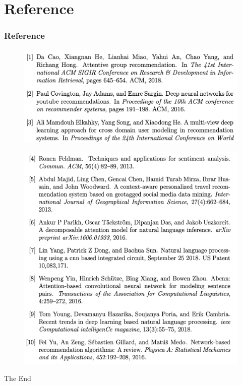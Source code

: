 \documentclass{beamer}
\begin{document}
\section{Reference}
\begin{frame}[allowframebreaks]
    \frametitle{Reference}
    \begin{figure}[]
        \centering
        \includegraphics[width=0.6\linewidth]{fig/ref1}

    \end{figure}
    \begin{figure}[]
        \centering
        \includegraphics[width=0.6\linewidth]{fig/ref2}

    \end{figure}

\end{frame}
\begin{frame}
\Huge{\centerline{The End}}
\end{frame}

\end{document}
